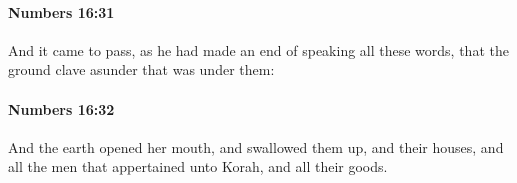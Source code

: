 		\paragraph{Numbers 16:31} %
			\label{NUMBERS-16-31}

			And it came to pass, as he had made an end of speaking all these words, that the ground clave asunder that was under them:


		\paragraph{Numbers 16:32} %
			\label{NUMBERS-16-32}

			And the earth opened her mouth, and swallowed them up, and their houses, and all the men that appertained unto Korah, and all their goods.



